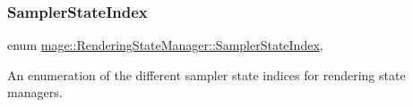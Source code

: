 \hypertarget{classmage_1_1_rendering_state_manager_a17ea0fda0247ee5d379b62a882db95a3}{}\label{classmage_1_1_rendering_state_manager_a17ea0fda0247ee5d379b62a882db95a3} 
\subsubsection{\texorpdfstring{Sampler\+State\+Index}{SamplerStateIndex}}
{\footnotesize\ttfamily enum \hyperlink{classmage_1_1_rendering_state_manager_a17ea0fda0247ee5d379b62a882db95a3}{mage\+::\+Rendering\+State\+Manager\+::\+Sampler\+State\+Index}\hspace{0.3cm}{\ttfamily [strong]}, {\ttfamily [private]}}

An enumeration of the different sampler state indices for rendering state managers.

